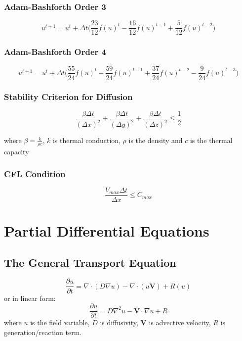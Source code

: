 \documentclass[12pt]{extarticle}
\begin{document}
\subsubsection*{Adam-Bashforth Order 3}
\begin{equation}
u^{t+1}=u^{t}+\Delta t \Big ( \frac{23}{12} f(u)^{t}- \frac{16}{12} f(u)^{t-1} +  \frac{5}{12} f(u)^{t-2} \Big)
\end{equation}
\subsubsection*{Adam-Bashforth Order 4}
\begin{equation}
u^{t+1}=u^{t}+\Delta t \Big ( \frac{55}{24} f(u)^{t}- \frac{59}{24} f(u)^{t-1} +  \frac{37}{24} f(u)^{t-2} - \frac{9}{24} f(u)^{t-3} \Big)
\end{equation}

\subsubsection*{Stability Criterion for Diffusion}
\begin{equation}
    \frac{\beta \Delta t}{(\Delta x)^{2}} + \frac{\beta \Delta t}{(\Delta y)^{2}} + \frac{\beta \Delta t}{(\Delta z)^{2}} \leq \frac{1}{2}
\end{equation}

where $\beta = \frac{k}{\rho c}$, $k$ is thermal conduction, $\rho$ is the density and $c$ is the thermal capacity

\subsubsection*{CFL Condition}
\begin{equation}
\frac{V_{max} \Delta t}{\Delta x} \leq C_{max}
\end{equation}

\clearpage
\section{Partial Differential Equations}
\subsection*{The General Transport Equation}
\begin{equation}
\frac{\partial u}{\partial t} = \nabla \cdot (D \nabla u) - \nabla \cdot (u \textbf{V}) + R(u)
\end{equation}
or in linear form:
\begin{equation}
\frac{\partial u}{\partial t} = D \nabla^{2} u - \textbf{V} \cdot \nabla u + R
\end{equation}
where $u$ is the field variable, $D$ is diffusivity, $\textbf{V}$ is advective velocity, $R$ is generation/reaction term.
\end{document}
